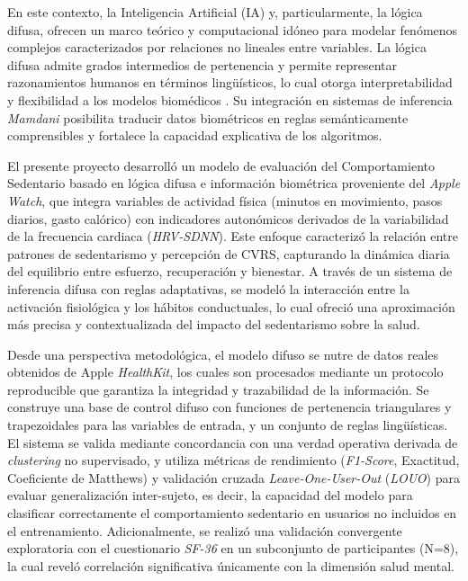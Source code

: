 En este contexto, la Inteligencia Artificial (IA) y, particularmente, la lógica difusa, ofrecen un marco teórico y computacional idóneo para modelar fenómenos complejos caracterizados por relaciones no lineales entre variables. La lógica difusa admite grados intermedios de pertenencia y permite representar razonamientos humanos en términos lingüísticos, lo cual otorga interpretabilidad y flexibilidad a los modelos biomédicos \cite{Zadeh1965,Ross2010,Kaur2022}. Su integración en sistemas de inferencia \textit{Mamdani} posibilita traducir datos biométricos en reglas semánticamente comprensibles y fortalece la capacidad explicativa de los algoritmos.

El presente proyecto desarrolló un modelo de evaluación del Comportamiento Sedentario basado en lógica difusa e información biométrica proveniente del \textit{Apple Watch}, que integra variables de actividad física (minutos en movimiento, pasos diarios, gasto calórico) con indicadores autonómicos derivados de la variabilidad de la frecuencia cardiaca (\textit{HRV-SDNN}). Este enfoque caracterizó la relación entre patrones de sedentarismo y percepción de CVRS, capturando la dinámica diaria del equilibrio entre esfuerzo, recuperación y bienestar. A través de un sistema de inferencia difusa con reglas adaptativas, se modeló la interacción entre la activación fisiológica y los hábitos conductuales, lo cual ofreció una aproximación más precisa y contextualizada del impacto del sedentarismo sobre la salud.

Desde una perspectiva metodológica, el modelo difuso se nutre de datos reales obtenidos de Apple \textit{HealthKit}, los cuales son procesados mediante un protocolo reproducible que garantiza la integridad y trazabilidad de la información. Se construye una base de control difuso con funciones de pertenencia triangulares y trapezoidales para las variables de entrada, y un conjunto de reglas lingüísticas. El sistema se valida mediante concordancia con una verdad operativa derivada de \textit{clustering} no supervisado, y utiliza métricas de rendimiento (\textit{F1-Score}, Exactitud, Coeficiente de Matthews) y validación cruzada \textit{Leave-One-User-Out} (\textit{LOUO}) para evaluar generalización inter-sujeto, es decir, la capacidad del modelo para clasificar correctamente el comportamiento sedentario en usuarios no incluidos en el entrenamiento. Adicionalmente, se realizó una validación convergente exploratoria con el cuestionario \textit{SF-36} en un subconjunto de participantes (N=8), la cual reveló correlación significativa únicamente con la dimensión salud mental.

